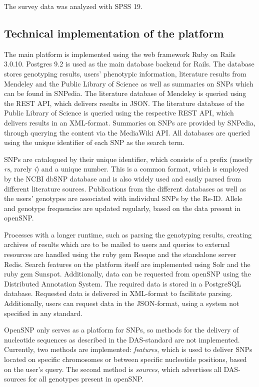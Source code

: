 \documentclass[10pt]{article}
\begin{document}
The survey data was analyzed with SPSS 19. 

\subsection*{Technical implementation of the platform}
The main platform is implemented using the web framework Ruby on Rails 3.0.10. Postgres 9.2 is used as the main database backend for Rails. 
The database stores genotyping results, users' phenotypic information, literature results from Mendeley and the Public Library of Science as well as summaries on SNPs 
which can be found in SNPedia. The literature database of Mendeley is queried using the REST API, which delivers results in JSON. The literature database of 
the Public Library of Science is queried using the respective REST API, which delivers results in an XML-format. Summaries on SNPs are provided by SNPedia, 
through querying the content via the MediaWiki API. All databases are queried using the unique identifier of each SNP as the search term. 

SNPs are catalogued by their unique identifier, which consists of a prefix (mostly \textit{rs}, rarely \textit{i}) and a unique number. This is a common format, 
which is employed by the NCBI dbSNP database \cite{Sherry2001} and is also widely used and easily parsed from different literature sources. Publications from the different databases as 
well as the users' genotypes are associated with individual SNPs by the Rs-ID. Allele and genotype frequencies are updated regularly, based on the data present in openSNP. 

Processes with a longer runtime, such as parsing the genotyping results, creating archives of results which are to be mailed to users and queries to external resources 
are handled using the ruby gem Resque and the standalone server Redis. Search features on the platform itself are implemented using Solr and the ruby gem Sunspot. 
Additionally, data can be requested from openSNP using the Distributed Annotation System. The required data is stored in a PostgreSQL database.  
Requested data is delivered in XML-format to facilitate parsing. Additionally, users can request data in the JSON-format, using a system not specified in any standard.

OpenSNP only serves as a platform for SNPs, so methods for the delivery of nucleotide sequences as described in the DAS-standard are not implemented. Currently, 
two methods are implemented: \textit{features}, which is used to deliver SNPs located on specific chromosomes or between specific nucleotide positions, 
based on the user's query. The second method is \textit{sources}, which advertises all DAS-sources for all genotypes present in openSNP.
\end{document}
